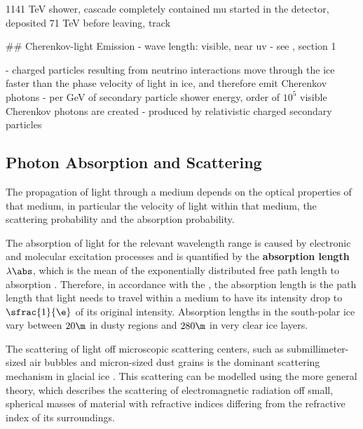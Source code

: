  1141 TeV shower, cascade completely contained \cite{evidence2013,energyreco}
 mu started in the detector, deposited 71 TeV before leaving, track \cite{evidence2013,energyreco}


## Cherenkov-light Emission
- wave length: visible, near uv
- see \cite{ppcpaper}, section 1

- charged particles resulting from neutrino interactions move through the ice faster than the phase velocity of light in ice, and therefore emit Cherenkov photons \cite{instrumentation}
- per GeV of secondary particle shower energy, order of $10^5$ visible Cherenkov photons are created \cite{instrumentation}
- produced by relativistic charged secondary particles \cite{skysearch}

\subsection{Photon Absorption and Scattering}
\label{sec:scattering}

The propagation of light through a medium depends on the optical properties of that medium, in particular the velocity of light within that medium, the scattering probability and the absorption probability. \cite{lundberg}

The absorption of light for the relevant wavelength range is caused by electronic and molecular excitation processes \cite{lundberg}
and is quantified by the \textbf{absorption length} $\lambda\abs$, which is the mean of the exponentially distributed free path length to absorption \cite{lundberg}.
Therefore, in accordance with the , the absorption length is the path length that light needs to travel within a medium to have its intensity drop to $\sfrac{1}{\e}$ of its original intensity. \cite{lexikonderphysik}
Absorption lengths in the south-polar ice vary between $20\m$ in dusty regions and $280\m$ in very clear ice layers. \cite{ackermann}\cite{ppcpaper}\cite{icepaper}

The scattering of light off microscopic scattering centers, such as submillimeter-sized air bubbles and micron-sized dust grains \cite{Price1997}\cite{ackermann} is the dominant scattering mechanism in glacial ice \cite{Askebjer1997}\cite{lundberg}. This scattering can be modelled using the more general  theory, which describes the scattering of electromagnetic radiation off small, spherical masses of material with refractive indices differing from the refractive index of its surroundings. \cite{Mie1908}\cite{ackermann}\cite{lundberg}

